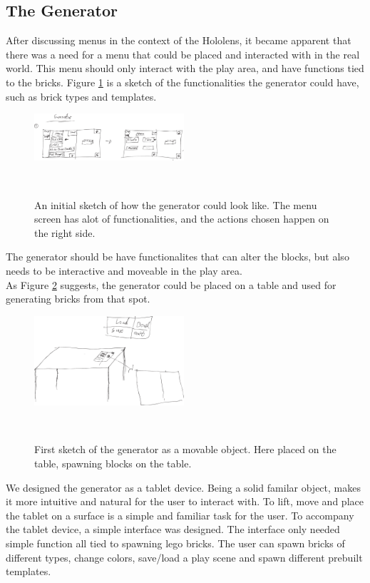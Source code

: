 \subsection{The Generator}
After discussing menus in the context of the Hololens, it became apparent that there was a need for a menu that could be placed and interacted with in the real world. This menu should only interact with the play area, and have functions tied to the bricks. Figure \ref{fig:genboard1} is a sketch of the functionalities the generator could have, such as brick types and templates.
\begin{figure}[t]
	\centering
	\includegraphics[width=210px]{figures/Generator/gen5_1.pdf}
	\caption{An initial sketch of how the generator could look like. The menu screen has alot of functionalities, and the actions chosen happen on the right side.}~\label{fig:genboard1}
\end{figure}
The generator should be have functionalites that can alter the blocks, but also needs to be interactive and moveable in the play area.\\
As Figure \ref{fig:gentablet} suggests, the generator could be placed on a table and used for generating bricks from that spot.
\begin{figure}[t]
	\centering
	\includegraphics[width=210px]{figures/Generator/gen6_1.pdf}
	\caption{First sketch of the generator as a movable object. Here placed on the table, spawning blocks on the table.}~\label{fig:gentablet}
\end{figure}
We designed the generator as a tablet device. Being a solid familar object, makes it more intuitive and natural for the user to interact with. To lift, move and place the tablet on a surface is a simple and familiar task for the user. To accompany the tablet device, a simple interface was designed. The interface only needed simple function all tied to spawning lego bricks. The user can spawn bricks of different types, change colors, save/load a play scene and spawn different prebuilt templates.

